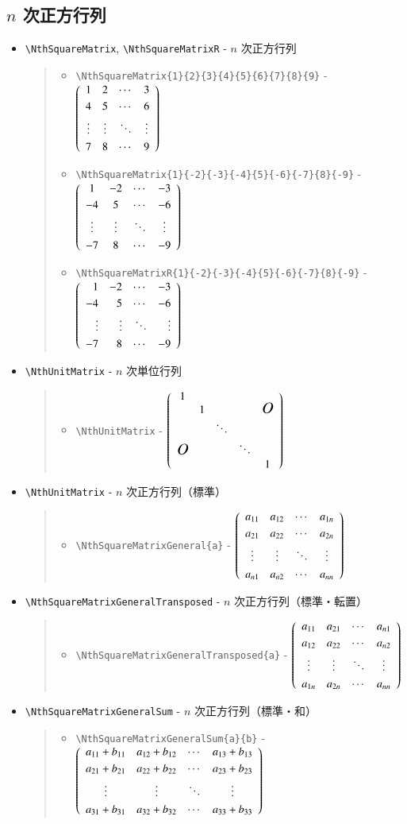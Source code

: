 \documentclass[oneside,10pt,a4paper]{jsarticle}
\begin{document}
  \newpage

  \subsection{$n$ 次正方行列}

  \begin{itemize}
    \item \verb|\NthSquareMatrix|, \verb|\NthSquareMatrixR| - $n$ 次正方行列
      \begin{quote}
        \Example
        \begin{itemize}
          \item \verb|\NthSquareMatrix{1}{2}{3}{4}{5}{6}{7}{8}{9}| - $\NthSquareMatrix{1}{2}{3}{4}{5}{6}{7}{8}{9}$
          \item \verb|\NthSquareMatrix{1}{-2}{-3}{-4}{5}{-6}{-7}{8}{-9}| - $\NthSquareMatrix{1}{-2}{-3}{-4}{5}{-6}{-7}{8}{-9}$
          \item \verb|\NthSquareMatrixR{1}{-2}{-3}{-4}{5}{-6}{-7}{8}{-9}| - $\NthSquareMatrixR{1}{-2}{-3}{-4}{5}{-6}{-7}{8}{-9}$
        \end{itemize}
      \end{quote}
    \item \verb|\NthUnitMatrix| - $n$ 次単位行列 \label{NthUnitMatrix}
      \begin{quote}
        \Example
        \begin{itemize}
          \item \verb|\NthUnitMatrix| - $\NthUnitMatrix$
        \end{itemize}
      \end{quote}

    \item \verb|\NthUnitMatrix| - $n$ 次正方行列（標準）
      \begin{quote}
        \Example
        \begin{itemize}
          \item \verb|\NthSquareMatrixGeneral{a}| - $\NthSquareMatrixGeneral{a}$
        \end{itemize}
      \end{quote}
    \item \verb|\NthSquareMatrixGeneralTransposed| - $n$ 次正方行列（標準・転置）
      \begin{quote}
        \Example
        \begin{itemize}
          \item \verb|\NthSquareMatrixGeneralTransposed{a}| - $\NthSquareMatrixGeneralTransposed{a}$
        \end{itemize}
      \end{quote}
    \item \verb|\NthSquareMatrixGeneralSum| - $n$ 次正方行列（標準・和）
      \begin{quote}
        \Example
        \begin{itemize}
          \item \verb|\NthSquareMatrixGeneralSum{a}{b}| - $\NthSquareMatrixGeneralSum{a}{b}$
        \end{itemize}
      \end{quote}
  \end{itemize}
\end{document}
